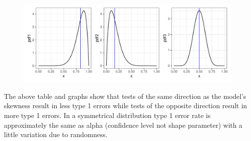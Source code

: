 \documentclass{article}\usepackage[]{graphicx}\usepackage[]{xcolor}
\begin{document}
\begin{enumerate}
\begin{enumerate}
\begin{figure}[ht]
\centering
\includegraphics[width = \linewidth]{graphs.pdf}
\end{figure}

The above table and graphs show that tests of the same direction as the model's skewness result in less type 1 errors while tests of the opposite direction result in more type 1 errors. In a symmetrical distribution type 1 error rate is approximately the same as alpha (confidence level not shape parameter) with a little variation due to randomness.

  \end{enumerate}
\end{enumerate}

\end{document}
